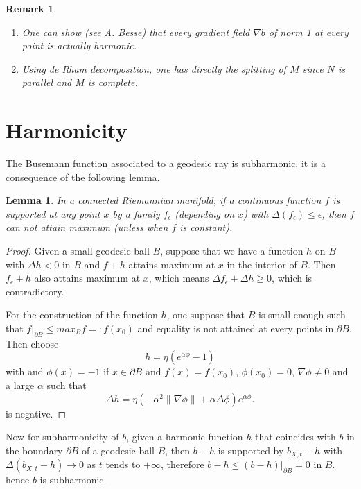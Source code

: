 \documentclass[11pt]{article}
\newtheorem{remark}{Remark}
\newtheorem{lemma}[theorem]{Lemma}
\begin{document}
\begin{remark}
\begin{enumerate}
\item One can show (see A. Besse) that every gradient field \(\nabla b\) of norm 1 at every point is actually harmonic.
\item Using de Rham decomposition, one has directly the splitting of \(M\) since \(N\) is parallel and \(M\) is complete.
\end{enumerate}
\end{remark}

\section{Harmonicity}
\label{sec:org9569f29}
The Busemann function associated to a geodesic ray is subharmonic, it is a consequence of the
following lemma.


\begin{lemma}
\label{lem:1}%
In a connected Riemannian manifold, if a continuous function \(f\) is supported at any point \(x\) by
a family \(f_\epsilon\) (depending on \(x\)) with \(\Delta(f_\epsilon)\leq \epsilon\), then \(f\) can not
attain maximum (unless when \(f\) is constant).
\end{lemma}

\begin{proof}
Given a small geodesic ball \(B\), suppose that we have a function \(h\) on \(B\) with \(\Delta h <0\) in \(B\) and
\(f+h\) attains maximum at \(x\) in the interior of \(B\). Then \(f_\epsilon + h\) also attains maximum at
\(x\), which means \(\Delta f_\epsilon + \Delta h \geq 0\), which is contradictory.

For the construction of the function \(h\), one suppose that \(B\) is small enough such that
\(f|_{\partial B} \leq max_B f=: f(x_0)\) and equality is not attained at every points in \(\partial B\). Then
choose
\[
h = \eta (e^{\alpha \phi} - 1)
\]
with and \(\phi(x) = -1\) if \(x\in \partial B\) and \(f(x) = f(x_0)\), \(\phi(x_0) = 0\),
\(\nabla \phi \ne 0\) and a large  \(\alpha\) such that
\[
\Delta h = \eta (-\alpha^2\| \nabla \phi\| + \alpha \Delta \phi)e^{\alpha \phi}.
\]
is negative.
\end{proof}


Now for subharmonicity of \(b\), given a harmonic function \(h\) that coincides with \(b\) in the boundary \(\partial B\) of a
geodesic ball \(B\), then \(b-h\) is supported by \(b_{X,t} - h\) with \(\Delta (b_{X,t}-h) \to 0\) as \(t\)
tends to \(+\infty\), therefore \(b-h \leq (b-h)|_{\partial B} = 0\) in \(B\). hence \(b\) is subharmonic.
\end{document}

